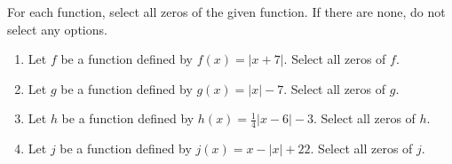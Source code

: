 \documentclass{ximera}
\author{Kenneth Berglund}
\begin{document}
\licenseSZ
\begin{exercise}
For each function, select all zeros of the given function. If there are none, do not select any options.

\begin{enumerate}
\item Let $f$ be a function defined by $f(x) = |x + 7|$.
Select all zeros of $f$.
\begin{selectAll}
\end{selectAll}

\item Let $g$ be a function defined by $g(x) = |x| - 7$.
Select all zeros of $g$.
\begin{selectAll}
\end{selectAll}

\item Let $h$ be a function defined by $h(x) = \frac{1}{4}|x - 6| - 3$.
Select all zeros of $h$.
\begin{selectAll}
\end{selectAll}

\item Let $j$ be a function defined by $j(x) = x - |x| + 22$.
Select all zeros of $j$.
\begin{selectAll}
\end{selectAll}

\end{enumerate}

\end{exercise}
\end{document}
